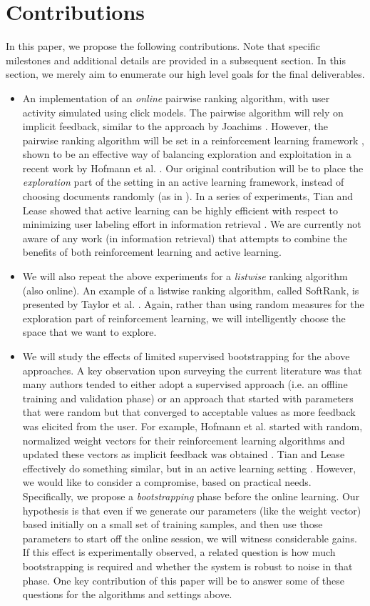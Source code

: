 \documentclass{acm_proc_article-sp}
\begin{document}
\section{Contributions}
In this paper, we propose the following contributions. Note that specific milestones and additional details are provided in a subsequent section. In this section, we merely aim to enumerate our high level goals for the final deliverables.
\begin{itemize}
\item An implementation of an \emph{online} pairwise ranking algorithm, with user activity simulated using click models. The pairwise algorithm will rely on implicit feedback, similar to the approach by Joachims \cite{joachims}. However, the pairwise ranking algorithm will be set in a reinforcement learning framework \cite{rl}, shown to be an effective way of balancing exploration and exploitation in a recent work by Hofmann et al. \cite{hofmann}. Our original contribution will be to place the \emph{exploration} part of the setting in an active learning framework, instead of choosing documents randomly (as in \cite{hofmann}). In a series of experiments, Tian and Lease showed that active learning can be highly efficient with respect to minimizing user labeling effort in information retrieval \cite{aibo}. We are currently not aware of any work (in information retrieval) that attempts to combine the benefits of both reinforcement learning and active learning. 
\item We will also repeat the above experiments for a \emph{listwise} ranking algorithm (also online). An example of a listwise ranking algorithm, called SoftRank, is presented by Taylor et al. \cite{taylor}. Again, rather than using random measures for the exploration part of reinforcement learning, we will intelligently choose the space that we want to explore.
\item We will study the effects of limited supervised bootstrapping for the above approaches. A key observation upon surveying the current literature was that many authors tended to either adopt a supervised approach (i.e. an offline training and validation phase) or an approach that started with parameters that were random but that converged to acceptable values as more feedback was elicited from the user. For example, Hofmann et al. started with random, normalized weight vectors for their reinforcement learning algorithms and updated these vectors as implicit feedback was obtained \cite{hofmann}. Tian and Lease effectively do something similar, but in an active learning setting \cite{aibo}. However, we would like to consider a compromise, based on practical needs. Specifically, we propose a \emph{bootstrapping} phase before the online learning. Our hypothesis is that even if we generate our parameters (like the weight vector) based initially on a small set of training samples, and then use those parameters to start off the online session, we will witness considerable gains. If this effect is experimentally observed, a related question is how much bootstrapping is required and whether the system is robust to noise in that phase. One key contribution of this paper will be to answer some of these questions for the algorithms and settings above.  
\end{itemize}
\end{document}
